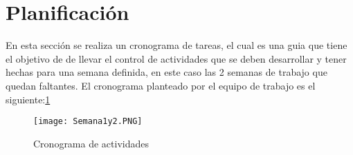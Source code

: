 \documentclass{article}
\begin{document}
\section{Planificación}
\noindent En esta sección se realiza un cronograma de tareas, el cual es una guia que tiene el objetivo de de llevar el control de actividades que se deben desarrollar y tener hechas para una semana definida, en este caso las 2 semanas de trabajo que quedan faltantes. El cronograma planteado por el equipo de trabajo es el siguiente:\ref{f2}

\begin{figure}[h!]
    \texttt{[image: Semana1y2.PNG]}
    \centering
    \caption{Cronograma de actividades}
    \label{f2}
    \end{figure}

\\

\end{document}
